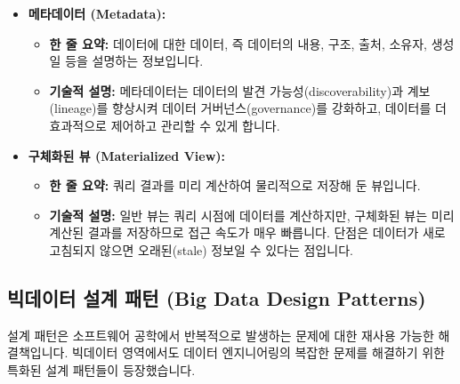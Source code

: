 \documentclass[11pt,a4paper]{article}
\begin{document}
\begin{itemize}
\begin{itemize}
        \item \textbf{외부 테이블 (External Tables):} 데이터는 외부 저장소(예: S3, HDFS)에 저장되고, 프레임워크는 메타데이터만 관리합니다. 테이블을 삭제해도 실제 데이터는 삭제되지 않고 외부 저장소에 남아 있습니다.
        \item \textbf{주요 차이점:} 데이터의 물리적 저장 위치와 프레임워크에 의한 데이터 관리 범위입니다. 외부 테이블은 데이터의 독립성을 유지할 수 있어 다른 시스템과의 공유에 유리합니다.
    \end{itemize}
    \item \textbf{메타데이터 (Metadata):}
    \begin{itemize}
        \item \textbf{한 줄 요약:} 데이터에 대한 데이터, 즉 데이터의 내용, 구조, 출처, 소유자, 생성일 등을 설명하는 정보입니다.
        \item \textbf{기술적 설명:} 메타데이터는 데이터의 발견 가능성(discoverability)과 계보(lineage)를 향상시켜 데이터 거버넌스(governance)를 강화하고, 데이터를 더 효과적으로 제어하고 관리할 수 있게 합니다.
    \end{itemize}
    \item \textbf{구체화된 뷰 (Materialized View):}
    \begin{itemize}
        \item \textbf{한 줄 요약:} 쿼리 결과를 미리 계산하여 물리적으로 저장해 둔 뷰입니다.
        \item \textbf{기술적 설명:} 일반 뷰는 쿼리 시점에 데이터를 계산하지만, 구체화된 뷰는 미리 계산된 결과를 저장하므로 접근 속도가 매우 빠릅니다. 단점은 데이터가 새로고침되지 않으면 오래된(stale) 정보일 수 있다는 점입니다.
    \end{itemize}
\end{itemize}

\subsection{빅데이터 설계 패턴 (Big Data Design Patterns)}
설계 패턴은 소프트웨어 공학에서 반복적으로 발생하는 문제에 대한 재사용 가능한 해결책입니다. 빅데이터 영역에서도 데이터 엔지니어링의 복잡한 문제를 해결하기 위한 특화된 설계 패턴들이 등장했습니다.
\end{document}
